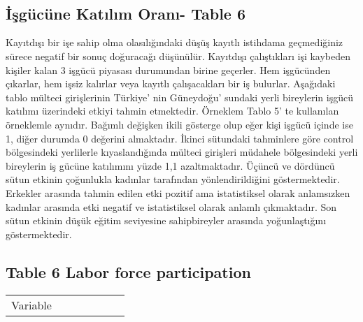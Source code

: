 \documentclass{article}
\begin{document}
\
{

\def\sym#1{\ifmmode^{#1}\else\(^{#1}\)\fi}

\
\newpage
    \subsection*{İşgücüne Katılım Oranı- Table 6}
    Kayıtdışı bir işe sahip olma olasılığındaki düşüş kayıtlı istihdama geçmediğiniz sürece negatif bir sonuç doğuracağı düşünülür. Kayıtdışı çalıştıkları işi kaybeden kişiler kalan 3 işgücü piyasası durumundan birine geçerler. Hem işgücünden çıkarlar, hem işsiz kalırlar veya kayıtlı çalışacakları bir iş bulurlar. Aşağıdaki tablo mülteci girişlerinin Türkiye’ nin Güneydoğu’ sundaki yerli bireylerin işgücü katılımı üzerindeki etkiyi tahmin etmektedir. Örneklem Tablo 5’ te kullanılan örneklemle aynıdır. Bağımlı değişken ikili gösterge olup eğer kişi işgücü içinde ise 1, diğer durumda 0 değerini almaktadır. İkinci sütundaki tahminlere göre control bölgesindeki yerlilerle kıyaslandığında mülteci girişleri müdahele bölgesindeki yerli bireylerin iş gücüne katılımını yüzde 1,1 azaltmaktadır. Üçüncü ve dördüncü sütun etkinin çoğunlukla kadınlar tarafından yönlendirildiğini göstermektedir. Erkekler arasında tahmin edilen etki pozitif ama istatistiksel olarak anlamsızken kadınlar arasında etki negatif ve istatistiksel olarak anlamlı çıkmaktadır. Son sütun etkinin düşük eğitim seviyesine sahipbireyler arasında yoğunlaştığını göstermektedir.
  \subsection*{Table 6 Labor force participation}
\begin{tabular}{l*{6}{c}}
\hline

\hline\hline
            
Variable


\end{tabular}}
\end{document}
